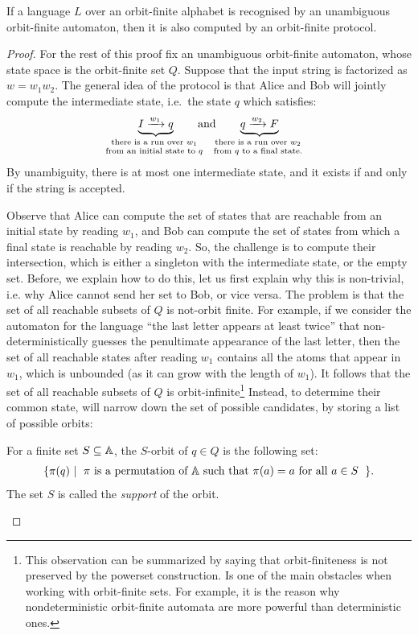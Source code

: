 \begin{theorem}
    \label{thm:unambiguous-to-protocol}
    If a language $L$ over an orbit-finite alphabet is recognised by an unambiguous orbit-finite automaton, then it is also computed by an orbit-finite protocol.
\end{theorem}
\begin{proof}
For the rest of this proof fix an unambiguous orbit-finite automaton, whose state space is the orbit-finite set $Q$.
Suppose that the input string is factorized as $w = w_1 w_2$. The general idea of the protocol is that Alice and Bob will jointly
compute the intermediate state, i.e.~the state $q$ which satisfies:
\begin{align*}
\myunderbrace{I \xrightarrow{w_1}q}{there is a run over $w_1$\\ from an initial state to $q$} \qquad \text{and} \qquad
\myunderbrace{q \xrightarrow{w_2} F}{there is a run over $w_2$\\ from $q$ to a final state.}
\end{align*}
By unambiguity, there is at most one intermediate state, and it exists if and only if the string is accepted.

Observe that Alice can compute
the set of states that are reachable from an initial state by reading $w_1$, and Bob can compute the set of states from which a final state is reachable by reading $w_2$. 
So, the challenge is to compute their intersection, which is either a singleton with the intermediate state, or the empty set. Before, we explain how to do this,
let us first explain why this is non-trivial, i.e. why Alice cannot send her set to Bob, or vice versa. The problem is that the set of all reachable subsets of $Q$ is not-orbit finite.
For example, if we consider the automaton for the language ``the last letter appears at least twice'' that non-deterministically guesses the penultimate appearance of the last letter, 
then the set of all reachable states after reading $w_1$ contains all the atoms that appear in $w_1$, which is unbounded (as it can grow with the length of $w_1$). It follows
that the set of all reachable subsets of $Q$ is orbit-infinite\footnote{
This observation can be summarized by saying that orbit-finiteness
is not preserved by the powerset construction. Is one of the main obstacles when working with orbit-finite sets. For example, it is the reason why nondeterministic orbit-finite automata are more powerful than deterministic ones.}
Instead, to determine their common state, will narrow down the set of possible candidates, by storing a list of possible orbits:
\begin{definition}[Orbit] \label{def:orbit}
    For a finite set $S \subseteq \mathbb A$, the $S$-orbit of $q \in Q$ is the following set:
    \begin{align*}
    \setbuild{ \pi(q)}{$\pi$ is a permutation of $\atoms$ such that $\pi(a)=a$ for all $a \in S$}.
    \end{align*}
The set $S$ is called the \emph{support} of the orbit.
\end{definition}


\end{proof}
